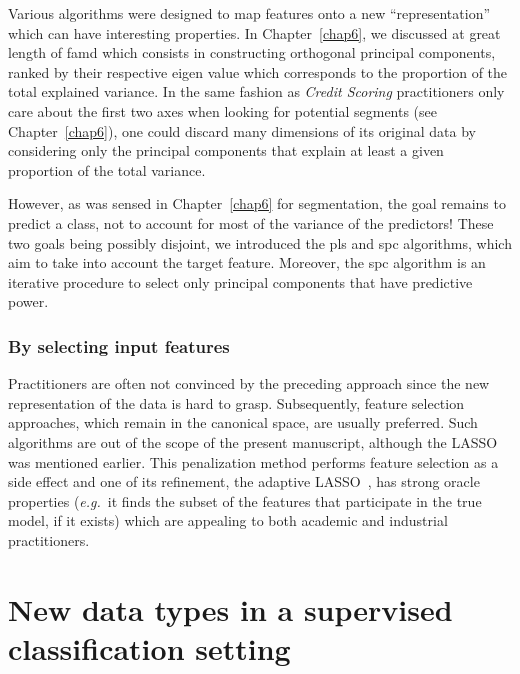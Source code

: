 Various algorithms were designed to map features onto a new ``representation'' which can have interesting properties. In Chapter~\ref{chap6}, we discussed at great length of \gls{famd} which consists in constructing orthogonal principal components, ranked by their respective eigen value which corresponds to the proportion of the total explained variance. In the same fashion as \textit{Credit Scoring} practitioners only care about the first two axes when looking for potential segments (see Chapter~\ref{chap6}), one could discard many dimensions of its original data by considering only the principal components that explain at least a given proportion of the total variance.

However, as was sensed in Chapter~\ref{chap6} for segmentation, the goal remains to predict a class, not to account for most of the variance of the predictors! These two goals being possibly disjoint, we introduced the \gls{pls} and \gls{spc} algorithms, which aim to take into account the target feature. Moreover, the \gls{spc} algorithm is an iterative procedure to select only principal components that have predictive power.


\subsubsection{By selecting input features}

Practitioners are often not convinced by the preceding approach since the new representation of the data is hard to grasp. Subsequently, feature selection approaches, which remain in the canonical space, are usually preferred. Such algorithms are out of the scope of the present manuscript, although the LASSO was mentioned earlier. This penalization method performs feature selection as a side effect and one of its refinement, the adaptive LASSO~\cite{zou2006adaptive}, has strong oracle properties (\textit{e.g.}\ it finds the subset of the features that participate in the true model, if it exists) which are appealing to both academic and industrial practitioners.

\section{New data types in a supervised classification setting}

